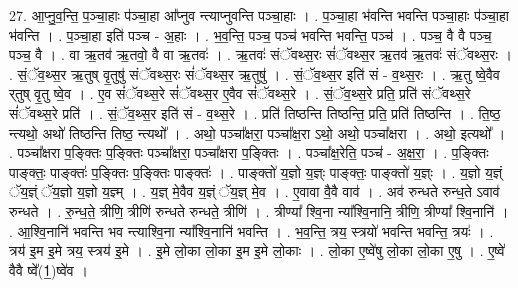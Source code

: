 \documentclass[17pt]{extarticle}
\begin{document}
27. आ॒प्नु॒व॒न्ति॒ प॒ञ्चा॒हाः प॑ञ्चा॒हा आ᳚प्नुव न्त्याप्नुवन्ति पञ्चा॒हाः । . प॒ञ्चा॒हा भ॑वन्ति भवन्ति पञ्चा॒हाः प॑ञ्चा॒हा भ॑वन्ति । . प॒ञ्चा॒हा इति॑ पञ्च - अ॒हाः । . भ॒व॒न्ति॒ पञ्च॒ पञ्च॑ भवन्ति भवन्ति॒ पञ्च॑ । . पञ्च॒ वै वै पञ्च॒ पञ्च॒ वै । . वा ऋ॒तव॑ ऋ॒तवो॒ वै वा ऋ॒तवः॑ । . ऋ॒तवः॑ संॅवथ्स॒रः सं॑ॅवथ्स॒र ऋ॒तव॑ ऋ॒तवः॑ संॅवथ्स॒रः । . सं॒ॅव॒थ्स॒र ऋ॒तुष् वृ॒तुषु॑ संॅवथ्स॒रः सं॑ॅवथ्स॒र ऋ॒तुषु॑ । . सं॒ॅव॒थ्स॒र इति॑ सं - व॒थ्स॒रः । . ऋ॒तु ष्वे॒वैव र्‌तुष् वृ॒तु ष्वे॒व । . ए॒व सं॑ॅवथ्स॒रे सं॑ॅवथ्स॒र ए॒वैव सं॑ॅवथ्स॒रे । . सं॒ॅव॒थ्स॒रे प्रति॒ प्रति॑ संॅवथ्स॒रे सं॑ॅवथ्स॒रे प्रति॑ । . सं॒ॅव॒थ्स॒र इति॑ सं - व॒थ्स॒रे । . प्रति॑ तिष्ठन्ति तिष्ठन्ति॒ प्रति॒ प्रति॑ तिष्ठन्ति । . ति॒ष्ठ॒ न्त्यथो॒ अथो॑ तिष्ठन्ति तिष्ठ॒ न्त्यथो᳚ । . अथो॒ पञ्चा᳚क्षरा॒ पञ्चा᳚क्ष॒रा ऽथो॒ अथो॒ पञ्चा᳚क्षरा । . अथो॒ इत्यथो᳚ । . पञ्चा᳚क्षरा प॒ङ्क्तिः प॒ङ्क्तिः पञ्चा᳚क्षरा॒ पञ्चा᳚क्षरा प॒ङ्क्तिः । . पञ्चा᳚क्ष॒रेति॒ पञ्च॑ - अ॒क्ष॒रा॒ । . प॒ङ्क्तिः पाङ्क्तः॒ पाङ्क्तः॑ प॒ङ्क्तिः प॒ङ्क्तिः पाङ्क्तः॑ । . पाङ्क्तो॑ य॒ज्ञो य॒ज्ञ्ः पाङ्क्तः॒ पाङ्क्तो॑ य॒ज्ञ्ः । . य॒ज्ञो य॒ज्ञ्ं ॅय॒ज्ञ्ं ॅय॒ज्ञो य॒ज्ञो य॒ज्ञ्म् । . य॒ज्ञ् मे॒वैव य॒ज्ञ्ं ॅय॒ज्ञ् मे॒व । . ए॒वावा वै॒वै वाव॑ । . अव॑ रुन्धते रुन्ध॒ते ऽवाव॑ रुन्धते । . रु॒न्ध॒ते॒ त्रीणि॒ त्रीणि॑ रुन्धते रुन्धते॒ त्रीणि॑ । . त्रीण्या᳚ श्वि॒ना न्या᳚श्वि॒नानि॒ त्रीणि॒ त्रीण्या᳚ श्वि॒नानि॑ । . आ॒श्वि॒नानि॑ भवन्ति भव न्त्याश्वि॒ना न्या᳚श्वि॒नानि॑ भवन्ति । . भ॒व॒न्ति॒ त्रय॒ स्त्रयो॑ भवन्ति भवन्ति॒ त्रयः॑ । . त्रय॑ इ॒म इ॒मे त्रय॒ स्त्रय॑ इ॒मे । . इ॒मे लो॒का लो॒का इ॒म इ॒मे लो॒काः । . लो॒का ए॒ष्वे॑षु लो॒का लो॒का ए॒षु । . ए॒ष्वे॑ वैवै ष्वे᳚(1॒)ष्वे॑व । \newline
\end{document}
